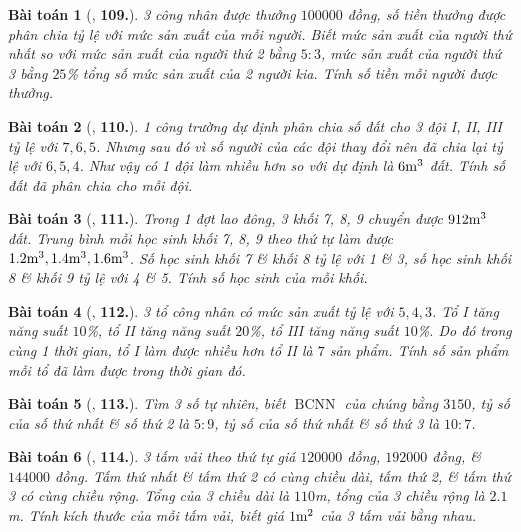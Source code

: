 \documentclass{article}
\numberwithin{equation}{section}
\newtheorem{baitoan}{Bài toán}
\begin{document}
\begin{baitoan}[\cite{Binh_Toan_7_tap_1}, \textbf{109.}]
	3 công nhân được thưởng $100000$ đồng, số tiền thưởng được phân chia tỷ lệ với mức sản xuất của mỗi người. Biết mức sản xuất của người thứ nhất so với mức sản xuất của người thứ 2 bằng $5:3$, mức sản xuất của người thứ 3 bằng $25$\% tổng số mức sản xuất của 2 người kia. Tính số tiền mỗi người được thưởng.
\end{baitoan}

\begin{baitoan}[\cite{Binh_Toan_7_tap_1}, \textbf{110.}]
	1 công trường dự định phân chia số đất cho 3 đội I, II, III tỷ lệ với $7,6,5$. Nhưng sau đó vì số người của các đội thay đổi nên đã chia lại tỷ lệ với $6,5,4$. Như vậy có 1 đội làm nhiều hơn so với dự định là $\rm6m^3$ đất. Tính số đất đã phân chia cho mỗi đội.
\end{baitoan}

\begin{baitoan}[\cite{Binh_Toan_7_tap_1}, \textbf{111.}]
	Trong 1 đợt lao đông, 3 khối 7, 8, 9 chuyển được $\rm912m^3$ đất. Trung bình mỗi học sinh khối 7, 8, 9 theo thứ tự làm được $\rm1.2m^3,1.4m^3,1.6m^3$. Số học sinh khối 7 \& khối 8 tỷ lệ với 1 \& 3, số học sinh khối 8 \& khối 9 tỷ lệ với 4 \& 5. Tính số học sinh của mỗi khối.
\end{baitoan}

\begin{baitoan}[\cite{Binh_Toan_7_tap_1}, \textbf{112.}]
	3 tổ công nhân có mức sản xuất tỷ lệ với $5,4,3$. Tổ I tăng năng suất $10$\%, tổ II tăng năng suất $20$\%, tổ III tăng năng suất $10$\%. Do đó trong cùng 1 thời gian, tổ I làm được nhiều hơn tổ II là $7$ sản phẩm. Tính số sản phẩm mỗi tổ đã làm được trong thời gian đó.
\end{baitoan}

\begin{baitoan}[\cite{Binh_Toan_7_tap_1}, \textbf{113.}]
	Tìm 3 số tự nhiên, biết $\operatorname{BCNN}$ của chúng bằng $3150$, tỷ số của số thứ nhất \& số thứ 2 là $5:9$, tỷ số của số thứ nhất \& số thứ 3 là $10:7$.
\end{baitoan}

\begin{baitoan}[\cite{Binh_Toan_7_tap_1}, \textbf{114.}]
	3 tấm vải theo thứ tự giá $120000$ đồng, $192000$ đồng, \& $144000$ đồng. Tấm thứ nhất \& tấm thứ 2 có cùng chiều dài, tấm thứ 2, \& tấm thứ 3 có cùng chiều rộng. Tổng của 3 chiều dài là $110$\emph{m}, tổng của 3 chiều rộng là $2.1$\emph{m}. Tính kích thước của mỗi tấm vải, biết giá $\rm1m^2$ của 3 tấm vải bằng nhau.
\end{baitoan}
\end{document}

